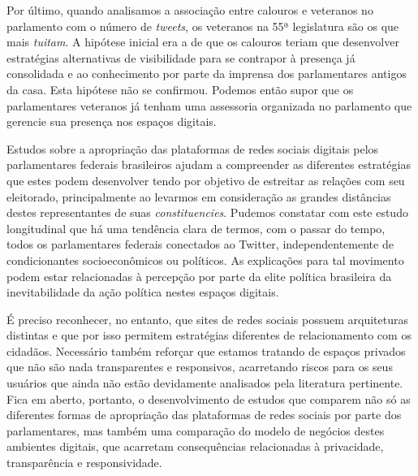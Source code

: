 Por último, quando analisamos a associação entre calouros e veteranos no
parlamento com o número de \emph{tweets}, os veteranos na 55ª
legislatura são os que mais \emph{tuitam}. A hipótese inicial era a de
que os calouros teriam que desenvolver estratégias alternativas de
visibilidade para se contrapor à presença já consolidada e ao
conhecimento por parte da imprensa dos parlamentares antigos da casa.
Esta hipótese não se confirmou. Podemos então supor que os parlamentares
veteranos já tenham uma assessoria organizada no parlamento que gerencie
sua presença nos espaços digitais.

Estudos sobre a apropriação das plataformas de redes sociais digitais
pelos parlamentares federais brasileiros ajudam a compreender as
diferentes estratégias que estes podem desenvolver tendo por objetivo de
estreitar as relações com seu eleitorado, principalmente ao levarmos em
consideração as grandes distâncias destes representantes de suas
\emph{constituencies}. Pudemos constatar com este estudo longitudinal
que há uma tendência clara de termos, com o passar do tempo, todos os
parlamentares federais conectados ao Twitter, independentemente de
condicionantes socioeconômicos ou políticos. As explicações para tal
movimento podem estar relacionadas à percepção por parte da elite
política brasileira da inevitabilidade da ação política nestes espaços
digitais.

É preciso reconhecer, no entanto, que sites de redes sociais possuem
arquiteturas distintas e que por isso permitem estratégias diferentes de
relacionamento com os cidadãos. Necessário também reforçar que estamos
tratando de espaços privados que não são nada transparentes e
responsivos, acarretando riscos para os seus usuários que ainda não
estão devidamente analisados pela literatura pertinente. Fica em aberto,
portanto, o desenvolvimento de estudos que comparem não só as diferentes
formas de apropriação das plataformas de redes sociais por parte dos
parlamentares, mas também uma comparação do modelo de negócios destes
ambientes digitais, que acarretam consequências relacionadas à
privacidade, transparência e responsividade.


